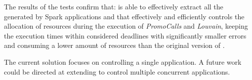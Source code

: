 
The results of the tests confirm that: \approach is able to effectively extract all the \plans generated by Spark applications and that \tool effectively and efficiently controls the allocation of resources during the execution of \textit{PromoCalls} and \textit{Louvain}, keeping the execution times within considered deadlines with significantly smaller errors and consuming a lower amount of resources than the original version of \cSpark.


The current solution focuses on controlling a single application. A future work could be directed at extending \tool to control multiple concurrent applications.




